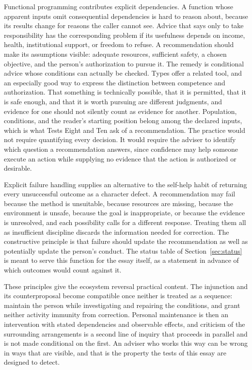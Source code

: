 \documentclass[12pt]{article}
\begin{document}
Functional programming contributes explicit dependencies. A function whose apparent inputs omit consequential dependencies is hard to reason about, because its results change for reasons the caller cannot see. Advice that says only to take responsibility has the corresponding problem if its usefulness depends on income, health, institutional support, or freedom to refuse. A recommendation should make its assumptions visible: adequate resources, sufficient safety, a chosen objective, and the person's authorization to pursue it. The remedy is conditional advice whose conditions can actually be checked. Types offer a related tool, and an especially good way to express the distinction between competence and authorization. That something is technically possible, that it is permitted, that it is safe enough, and that it is worth pursuing are different judgments, and evidence for one should not silently count as evidence for another. Population, conditions, and the reader's starting position belong among the declared inputs, which is what Tests Eight and Ten ask of a recommendation. The practice would not require quantifying every decision. It would require the adviser to identify which question a recommendation answers, since confidence may help someone execute an action while supplying no evidence that the action is authorized or desirable.

Explicit failure handling supplies an alternative to the self-help habit of returning every unsuccessful outcome as a character defect. A recommendation may fail because the method is unsuitable, because resources are missing, because the environment is unsafe, because the goal is inappropriate, or because the evidence is unresolved, and each possibility calls for a different response. Treating them all as insufficient discipline discards the information needed for correction. The constructive principle is that failure should update the recommendation as well as potentially update the person's conduct. The status table of Section~\ref{sec:status} is meant to serve this function for the essay itself, as a statement in advance of which outcomes would count against it.

These principles give the ecosystem reversal practical content. The injunction and its counterproposal become compatible once neither is treated as a sequence: maintain the person while investigating and repairing the conditions, and grant neither activity immunity from correction. Personal maintenance is then an intervention with stated dependencies and observable effects, and criticism of the surrounding arrangements is a second line of inquiry that proceeds in parallel and is not made conditional on the first. An adviser who works this way can be wrong in ways that are visible, and that is the property the tests of this essay are designed to detect.
\end{document}
